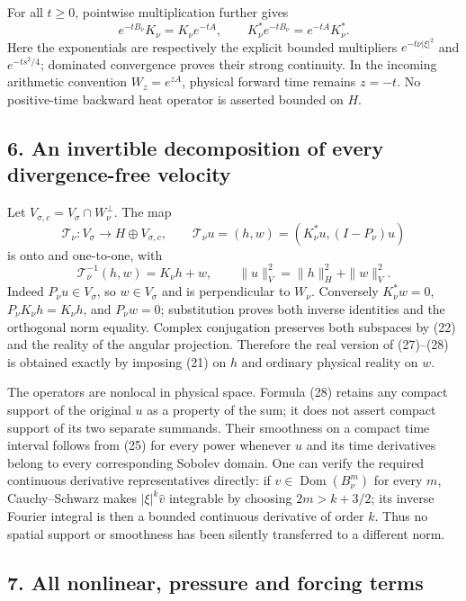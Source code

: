 For all \(t\ge0\), pointwise multiplication further gives \[
e^{-tB_\nu}K_\nu=K_\nu e^{-tA},\qquad
K_\nu^*e^{-tB_\nu}=e^{-tA}K_\nu^*.
\tag{26}
\] Here the exponentials are respectively the explicit bounded multipliers \(e^{-t\nu|\xi|^2}\) and \(e^{-ts^2/4}\); dominated convergence proves their strong continuity. In the incoming arithmetic convention \(W_z=e^{zA}\), physical forward time remains \(z=-t\). No positive-time backward heat operator is asserted bounded on \(H\).

\subsection{6. An invertible decomposition of every divergence-free velocity}\label{an-invertible-decomposition-of-every-divergence-free-velocity}

Let \(V_{\sigma,c}=V_\sigma\cap W_\nu^\perp\). The map \[
\mathcal T_\nu:V_\sigma\longrightarrow H\oplus V_{\sigma,c},\qquad
\mathcal T_\nu u=(h,w)=(K_\nu^*u,(I-P_\nu)u)
\tag{27}
\] is onto and one-to-one, with \[
\mathcal T_\nu^{-1}(h,w)=K_\nu h+w,
\qquad\|u\|_V^2=\|h\|_H^2+\|w\|_V^2.
\tag{28}
\] Indeed \(P_\nu u\in V_\sigma\), so \(w\in V_\sigma\) and is perpendicular to \(W_\nu\). Conversely \(K_\nu^*w=0\), \(P_\nu K_\nu h=K_\nu h\), and \(P_\nu w=0\); substitution proves both inverse identities and the orthogonal norm equality. Complex conjugation preserves both subspaces by (22) and the reality of the angular projection. Therefore the real version of (27)--(28) is obtained exactly by imposing (21) on \(h\) and ordinary physical reality on \(w\).

The operators are nonlocal in physical space. Formula (28) retains any compact support of the original \(u\) as a property of the sum; it does not assert compact support of its two separate summands. Their smoothness on a compact time interval follows from (25) for every power whenever \(u\) and its time derivatives belong to every corresponding Sobolev domain. One can verify the required continuous derivative representatives directly: if \(v\in\operatorname{Dom}(B_\nu^m)\) for every \(m\), Cauchy--Schwarz makes \(|\xi|^k\widehat v\) integrable by choosing \(2m>k+3/2\); its inverse Fourier integral is then a bounded continuous derivative of order \(k\). Thus no spatial support or smoothness has been silently transferred to a different norm.

\subsection{7. All nonlinear, pressure and forcing terms}\label{all-nonlinear-pressure-and-forcing-terms}


